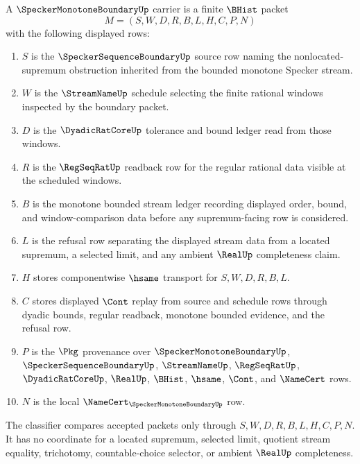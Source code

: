 \begin{definition}
\label{def:specker-monotone-boundary-carrier}
A $\SpeckerMonotoneBoundaryUp$ carrier is a finite $\BHist$ packet
$$
M=(S,W,D,R,B,L,H,C,P,N)
$$
with the following displayed rows:
\begin{enumerate}
\item $S$ is the $\SpeckerSequenceBoundaryUp$ source row naming the nonlocated-supremum obstruction inherited from the bounded monotone Specker stream.
\item $W$ is the $\StreamNameUp$ schedule selecting the finite rational windows inspected by the boundary packet.
\item $D$ is the $\DyadicRatCoreUp$ tolerance and bound ledger read from those windows.
\item $R$ is the $\RegSeqRatUp$ readback row for the regular rational data visible at the scheduled windows.
\item $B$ is the monotone bounded stream ledger recording displayed order, bound, and window-comparison data before any supremum-facing row is considered.
\item $L$ is the refusal row separating the displayed stream data from a located supremum, a selected limit, and any ambient $\RealUp$ completeness claim.
\item $H$ stores componentwise $\hsame$ transport for $S,W,D,R,B,L$.
\item $C$ stores displayed $\Cont$ replay from source and schedule rows through dyadic bounds, regular readback, monotone bounded evidence, and the refusal row.
\item $P$ is the $\Pkg$ provenance over $\SpeckerMonotoneBoundaryUp$, $\SpeckerSequenceBoundaryUp$, $\StreamNameUp$, $\RegSeqRatUp$, $\DyadicRatCoreUp$, $\RealUp$, $\BHist$, $\hsame$, $\Cont$, and $\NameCert$ rows.
\item $N$ is the local $\NameCert_{\SpeckerMonotoneBoundaryUp}$ row.
\end{enumerate}
The classifier compares accepted packets only through $S,W,D,R,B,L,H,C,P,N$. It has no coordinate for a located supremum, selected limit, quotient stream equality, trichotomy, countable-choice selector, or ambient $\RealUp$ completeness.
\end{definition}

